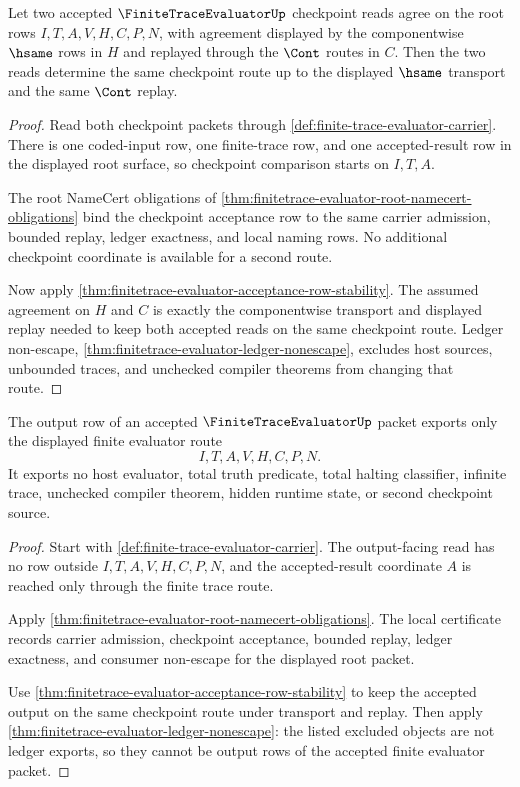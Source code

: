 \begin{theorem}
\label{thm:finite-trace-evaluator-checkpoint-determinacy}
Let two accepted $\FiniteTraceEvaluatorUp$ checkpoint reads agree on the root
rows $I,T,A,V,H,C,P,N$, with agreement displayed by the componentwise $\hsame$
rows in $H$ and replayed through the $\Cont$ routes in $C$. Then the two reads
determine the same checkpoint route up to the displayed $\hsame$ transport and
the same $\Cont$ replay.
\end{theorem}
\begin{proof}
Read both checkpoint packets through
\autoref{def:finite-trace-evaluator-carrier}. There is one coded-input row,
one finite-trace row, and one accepted-result row in the displayed root
surface, so checkpoint comparison starts on $I,T,A$.

The root NameCert obligations of
\autoref{thm:finitetrace-evaluator-root-namecert-obligations} bind the
checkpoint acceptance row to the same carrier admission, bounded replay,
ledger exactness, and local naming rows. No additional checkpoint coordinate is
available for a second route.

Now apply \autoref{thm:finitetrace-evaluator-acceptance-row-stability}. The
assumed agreement on $H$ and $C$ is exactly the componentwise transport and
displayed replay needed to keep both accepted reads on the same checkpoint
route. Ledger non-escape,
\autoref{thm:finitetrace-evaluator-ledger-nonescape}, excludes host sources,
unbounded traces, and unchecked compiler theorems from changing that route.
\end{proof}

\begin{theorem}
\label{thm:finite-trace-evaluator-output-nonescape}
The output row of an accepted $\FiniteTraceEvaluatorUp$ packet exports only the
displayed finite evaluator route
$$
I,T,A,V,H,C,P,N.
$$
It exports no host evaluator, total truth predicate, total halting classifier,
infinite trace, unchecked compiler theorem, hidden runtime state, or second
checkpoint source.
\end{theorem}
\begin{proof}
Start with \autoref{def:finite-trace-evaluator-carrier}. The output-facing
read has no row outside $I,T,A,V,H,C,P,N$, and the accepted-result coordinate
$A$ is reached only through the finite trace route.

Apply \autoref{thm:finitetrace-evaluator-root-namecert-obligations}. The local
certificate records carrier admission, checkpoint acceptance, bounded replay,
ledger exactness, and consumer non-escape for the displayed root packet.

Use \autoref{thm:finitetrace-evaluator-acceptance-row-stability} to keep the
accepted output on the same checkpoint route under transport and replay. Then
apply \autoref{thm:finitetrace-evaluator-ledger-nonescape}: the listed
excluded objects are not ledger exports, so they cannot be output rows of the
accepted finite evaluator packet.
\end{proof}
